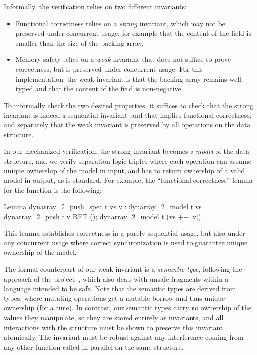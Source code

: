 Informally, the verification relies on two different invariants:
\begin{itemize}
\item Functional correctness relies on a \emph{strong} invariant,
  which may not be preserved under concurrent usage; for example that
  the content of the  field is smaller than the
  size of the backing array.
\item Memory-safety relies on a \emph{weak} invariant that does not
  suffice to prove correctness, but is preserved under concurrent
  usage. For this  implementation, the weak
  invariant is that the backing array remains well-typed and that the
  content of the  field is non-negative.
\end{itemize}
To informally check the two desired properties, it suffices to check
that the strong invariant is indeed a sequential invariant, and that
implies functional correctness; and separately that the weak invariant
is preserved by all operations on the data structure.

In our mechanized verification, the strong invariant becomes a \emph{model}
of the data structure, and we verify separation-logic triples where
each operation can assume unique ownership of the model in input, and
has to return ownership of a valid model in output, as is
standard. For example, the ``functional correctness'' lemma for the
 function is the following:

\begin{coqcode}
Lemma dynarray_2_push_spec t vs v :
  {{{ dynarray_2_model t vs }}}
    dynarray_2_push t v
  {{{ RET (); dynarray_2_model t (vs ++ [v]) }}}.
\end{coqcode}

This lemma establishes correctness in a purely-sequential usage, but
also under any concurrent usage where correct synchronization is used to
guarantee unique ownership of the model.

The formal counterpart of our weak invariant is a \emph{semantic type}, following the approach of the \RustBelt project~\citep*{DBLP:journals/pacmpl/0002JKD18}, which also deals with unsafe fragments within a language intended to be safe. Note that the \RustBelt semantic types are derived from \Rust types, where mutating operations get a mutable borrow and thus unique ownership (for a time). In contrast, our semantic types carry no ownership of the values they manipulate, so they are stored entirely as invariants, and all interactions with the structure must be shown to preserve this invariant atomically. The invariant must be robust against any interference coming from any other function called in parallel on the same structure.

